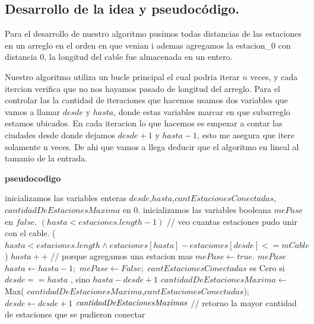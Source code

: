 \newpage
\subsection{Desarrollo de la idea y pseudocódigo.}

\vspace*{0.3cm}

\textbf{}
Para el desarrollo de nuestro algoritmo pusimos todas distancias de las estaciones en un arreglo en el orden en que venian i ademas agregamos la estacion_0 con distancia 0, la longitud del cable fue almacenada en un entero.
 
Nuestro algoritmo utiliza un bucle principal el cual podria iterar $n$ veces, y cada itercion verifica que no nos hayamos pasado de longitud del arreglo.
Para el controlar las la cantidad de iteraciones que hacemos usamos dos variables que vamos a llamar $desde$ y $hasta$, donde estas variables marcar en que subarreglo estamos ubicados. En cada iteracion lo que hacemos es empezar a contar las ciudades desde donde dejamos $desde+1$ y $hasta-1$, esto me asegura que itere solamente n veces. De ahi que vamos a llega deducir que el algoritmo en lineal al tamanio de la entrada. 


\textbf{pseudocodigo} \newline 

\begin{codebox}
	\li inicializamos las variables enteras $desde$,$hasta$,$cantEstacionesConectadas$,$cantidadDeEstacionesMaxima$ en 0.
	\li inicializamos las variables booleana $mePase$ en $false$.
	\li \While $(hasta < estaciones.length -1)$
	\li \Do	 // veo cuantas estaciones pudo unir con el cable.
		\li \While ($hasta<estaciones.length \land estaciones[hasta]-estaciones[desde]<=mCable$) 
		\li \Do	
				\li $hasta++$ // porque agregamos una estacion mas
				\li $mePase \leftarrow true$.
			\End
			\li \If $mePase$ 
			\li \Then 
					$hasta \leftarrow hasta-1;$
					$ mePase \leftarrow False;$
			\End		
			\li $cantEstacionesConectadas$ es Cero si $desde==hasta$ , sino $hasta-desde + 1$
			\li $cantidadDeEstacionesMaxima \leftarrow$ Max( $cantidadDeEstacionesMaxima$,$cantEstacionesConectadas$);
			\li $desde \leftarrow desde+1$  
		\End	
	\End
	\li \Return $\id{cantidadDeEstacionesMaximas}$ // retorno la mayor cantidad de estaciones que se pudieron conectar
	      
\end{codebox}

